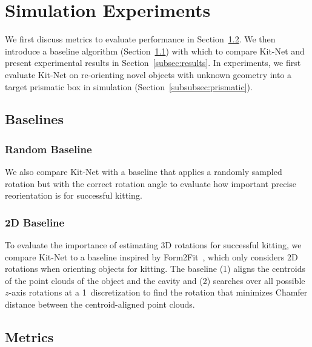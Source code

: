 \section{Simulation Experiments}
\label{sec:experiments}
We first discuss metrics to evaluate performance in Section~\ref{subsec:metrics}. We then introduce a baseline algorithm (Section~\ref{subsec:baseline}) with which to compare Kit-Net and present experimental results in Section~\ref{subsec:results}. In experiments, we first evaluate Kit-Net on re-orienting novel objects with unknown geometry into a target prismatic box in simulation (Section~\ref{subsubsec:prismatic}).
\subsection{Baselines}
\label{subsec:baseline}
\subsubsection{Random Baseline}
We also compare Kit-Net with a baseline that applies a randomly sampled rotation but with the correct rotation angle to evaluate how important precise reorientation is for successful kitting.

\subsubsection{2D Baseline}
To evaluate the importance of estimating 3D rotations for successful kitting, we compare Kit-Net to a baseline inspired by %
Form2Fit~\cite{Zakka2020Form2FitLS}, which only considers 2D rotations when orienting objects for kitting. The baseline (1) aligns the centroids of the point clouds of the object and the cavity and (2) searches over all possible $z$-axis rotations at a 1\textdegree~discretization to find the rotation that minimizes Chamfer distance between the centroid-aligned point clouds.

\subsection{Metrics}
\label{subsec:metrics}
